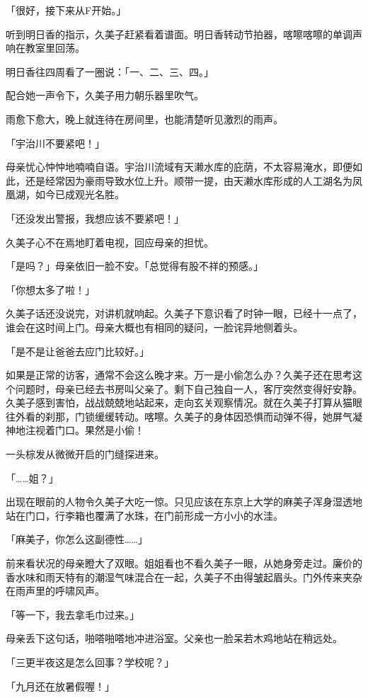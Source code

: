 \documentclass[UTF8]{ctexart}
\begin{document}
    「很好，接下来从F开始。」 

    听到明日香的指示，久美子赶紧看着谱面。明日香转动节拍器，喀嚓喀嚓的单调声响在教室里回荡。 

    明日香往四周看了一圈说：「一、二、三、四。」 

    配合她一声令下，久美子用力朝乐器里吹气。 

    雨愈下愈大，晚上就连待在房间里，也能清楚听见激烈的雨声。 

    「宇治川不要紧吧！」 

    母亲忧心忡忡地喃喃自语。宇治川流域有天濑水库的庇荫，不太容易淹水，即便如此，还是经常因为豪雨导致水位上升。顺带一提，由天濑水库形成的人工湖名为凤凰湖，如今已成观光名胜。 

    「还没发出警报，我想应该不要紧吧！」 

    久美子心不在焉地盯着电视，回应母亲的担忧。 

    「是吗？」母亲依旧一脸不安。「总觉得有股不祥的预感。」 

    「你想太多了啦！」 

    久美子话还没说完，对讲机就响起。久美子下意识看了时钟一眼，已经十一点了，谁会在这时间上门。母亲大概也有相同的疑问，一脸诧异地侧着头。 

    「是不是让爸爸去应门比较好。」 

    如果是正常的访客，通常不会这么晚才来。万一是小偷怎么办？久美子还在思考这个问题时，母亲已经去书房叫父亲了。剩下自己独自一人，客厅突然变得好安静。久美子感到害怕，战战兢兢地站起来，走向玄关观察情况。就在久美子打算从猫眼往外看的刹那，门锁缓缓转动。喀嚓。久美子的身体因恐惧而动弹不得，她屏气凝神地注视着门口。果然是小偷！ 

    一头棕发从微微开启的门缝探进来。 

    「……姐？」 

    出现在眼前的人物令久美子大吃一惊。只见应该在东京上大学的麻美子浑身湿透地站在门口，行李箱也覆满了水珠，在门前形成一方小小的水洼。 

    「麻美子，你怎么这副德性……」 

    前来看状况的母亲瞪大了双眼。姐姐看也不看久美子一眼，从她身旁走过。廉价的香水味和雨天特有的潮湿气味混合在一起，久美子不由得皱起眉头。门外传来夹杂在雨声里的呼啸风声。 

    「等一下，我去拿毛巾过来。」 

    母亲丢下这句话，啪嗒啪嗒地冲进浴室。父亲也一脸呆若木鸡地站在稍远处。 

    「三更半夜这是怎么回事？学校呢？」 

    「九月还在放暑假喔！」 
\end{document}
